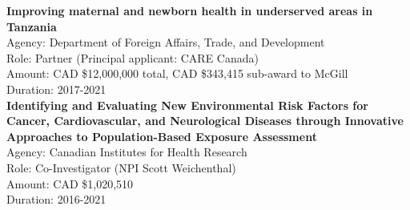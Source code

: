 \documentclass[
  letterpaper,
  DIV=11,
  numbers=noendperiod]{scrartcl}
\begin{document}
\textbf{Improving maternal and newborn health in underserved areas in
Tanzania}\\
\hspace*{0.333em}\hspace*{0.333em}\hspace*{0.333em}\hspace*{0.333em}Agency:
Department of Foreign Affairs, Trade, and Development\\
\hspace*{0.333em}\hspace*{0.333em}\hspace*{0.333em}\hspace*{0.333em}Role:
Partner (Principal applicant: CARE Canada)\\
\hspace*{0.333em}\hspace*{0.333em}\hspace*{0.333em}\hspace*{0.333em}Amount:
CAD \$12,000,000 total, CAD \$343,415 sub-award to McGill\\
\hspace*{0.333em}\hspace*{0.333em}\hspace*{0.333em}\hspace*{0.333em}Duration:
2017-2021\\

\textbf{Identifying and Evaluating New Environmental Risk Factors for
Cancer, Cardiovascular, and Neurological Diseases through Innovative
Approaches to Population-Based Exposure Assessment}\\
\hspace*{0.333em}\hspace*{0.333em}\hspace*{0.333em}\hspace*{0.333em}Agency:
Canadian Institutes for Health Research\\
\hspace*{0.333em}\hspace*{0.333em}\hspace*{0.333em}\hspace*{0.333em}Role:
Co-Investigator (NPI Scott Weichenthal)\\
\hspace*{0.333em}\hspace*{0.333em}\hspace*{0.333em}\hspace*{0.333em}Amount:
CAD \$1,020,510\\
\hspace*{0.333em}\hspace*{0.333em}\hspace*{0.333em}\hspace*{0.333em}Duration:
2016-2021\\
\end{document}
